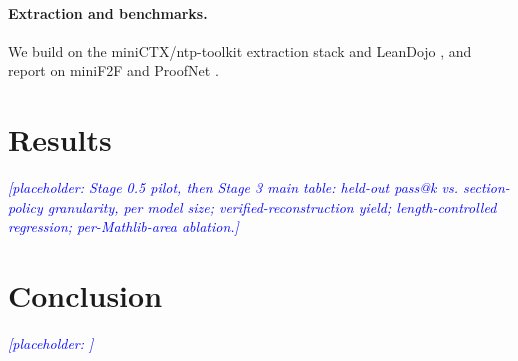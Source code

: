 \documentclass[11pt]{article}
\newcommand{\PLACEHOLDER}[1]{\textcolor{blue}{\emph{[placeholder: #1]}}}
\begin{document}
\paragraph{Extraction and benchmarks.} We build on the miniCTX/ntp-toolkit
extraction stack \citep{hu2024minictx} and LeanDojo \citep{yang2023leandojo},
and report on miniF2F \citep{zheng2022minif2f,minif2f_v2} and ProofNet
\citep{azerbayev2023proofnet}.

\section{Results}
\label{sec:results}
\PLACEHOLDER{Stage 0.5 pilot, then Stage 3 main table: held-out pass@k vs.
section-policy granularity, per model size; verified-reconstruction yield;
length-controlled regression; per-Mathlib-area ablation.}

\section{Conclusion}
\PLACEHOLDER{}



\end{document}
